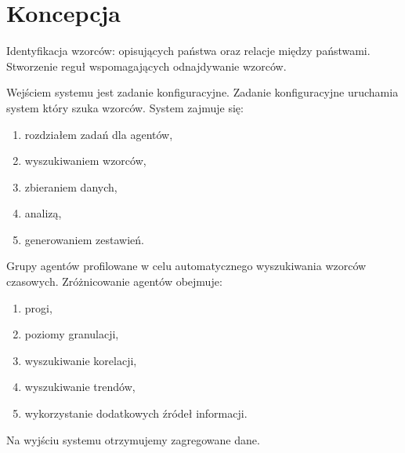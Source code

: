 \documentclass[11pt]{report}
\begin{document}
    \chapter{Koncepcja}\label{ch:koncepcja}
    Identyfikacja wzorców: opisujących państwa oraz relacje między państwami.
    Stworzenie reguł wspomagających odnajdywanie wzorców.

    Wejściem systemu jest zadanie konfiguracyjne.
    Zadanie konfiguracyjne uruchamia system który szuka wzorców.
    System zajmuje się:
    \begin{enumerate}
        \item rozdziałem zadań dla agentów,
        \item wyszukiwaniem wzorców,
        \item zbieraniem danych,
        \item analizą,
        \item generowaniem zestawień.
    \end{enumerate}

    Grupy agentów profilowane w celu automatycznego wyszukiwania wzorców czasowych.
    Zróżnicowanie agentów obejmuje:
    \begin{enumerate}
        \item progi,
        \item poziomy granulacji,
        \item wyszukiwanie korelacji,
        \item wyszukiwanie trendów,
        \item wykorzystanie dodatkowych źródeł informacji.
    \end{enumerate}

    Na wyjściu systemu otrzymujemy zagregowane dane.
\end{document}
